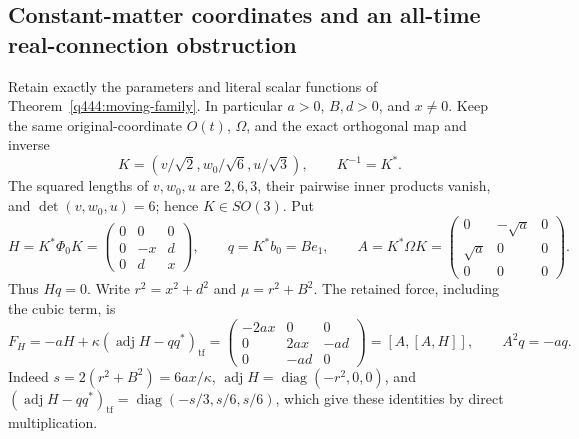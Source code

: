 \subsection{Constant-matter coordinates and an all-time real-connection obstruction}

Retain exactly the parameters and literal scalar functions of
Theorem~\ref{q444:moving-family}. In particular $a>0$, $B,d>0$, and
$x\ne0$. Keep the same original-coordinate $O(t)$, $\Omega$, and
the exact orthogonal map and inverse
\[
 K=\left(v/\sqrt2,w_0/\sqrt6,u/\sqrt3\right),\qquad K^{-1}=K^*.
\]
The squared lengths of $v,w_0,u$ are $2,6,3$, their pairwise inner
products vanish, and $\det(v,w_0,u)=6$; hence $K\in SO(3)$.
Put
\[
 H=K^*\Phi_0K=\begin{pmatrix}0&0&0\\0&-x&d\\0&d&x\end{pmatrix},
 \qquad q=K^*b_0=Be_1,\qquad
 A=K^*\Omega K=\begin{pmatrix}0&-\sqrt a&0\\\sqrt a&0&0\\0&0&0\end{pmatrix}.
\]
Thus $Hq=0$. Write $r^2=x^2+d^2$ and $\mu=r^2+B^2$.
The retained force, including the cubic term, is
\[
 F_H=-aH+\kappa(\operatorname{adj}H-qq^*)_{\mathrm{tf}}
 =\begin{pmatrix}-2ax&0&0\\0&2ax&-ad\\0&-ad&0\end{pmatrix}
 =[A,[A,H]],\qquad A^2q=-aq.
\]
Indeed $s=2(r^2+B^2)=6ax/\kappa$,
$\operatorname{adj}H=\operatorname{diag}(-r^2,0,0)$, and
$(\operatorname{adj}H-qq^*)_{\mathrm{tf}}
=\operatorname{diag}(-s/3,s/6,s/6)$, which give these identities
by direct multiplication.

